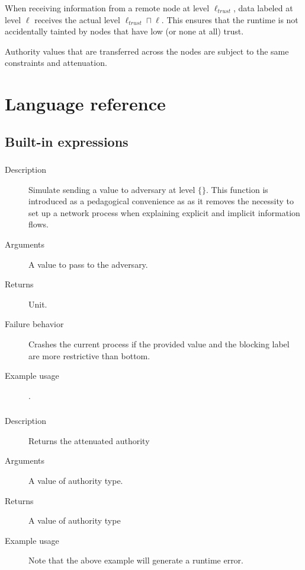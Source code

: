 When receiving information from a remote node at level $\ell_{\mathit{trust}}$, 
data labeled at level $\ell$ receives the actual level $\ell_{\mathit{trust}} \sqcap \ell$. 
This ensures that the runtime is not accidentally tainted by nodes that have low (or none at all) trust.

Authority values that are transferred across the nodes are subject to the same constraints and attenuation.



\clearpage
\appendix
\section{Language reference}

\subsection{Built-in expressions}

\subsubsection{}
\begin{description}
    \item [Description] Simulate sending a value to adversary at level $\{\}$. This function is introduced as a 
    pedagogical convenience as as it removes the necessity to set up a network process when explaining explicit and implicit information flows.
    \item [Arguments] A value to pass to the adversary.
    \item [Returns] Unit.
    \item [Failure behavior] Crashes the current process if the provided value and the blocking label are more restrictive than bottom.
    \item [Example usage] . 
\end{description}

\subsubsection{}
\begin{description}
    \item [Description] Returns the attenuated authority 
    \item [Arguments] A value of authority type.
    \item [Returns] A value of authority type
    \item [Example usage]  Note that the above example will generate a runtime error.
\end{description}


